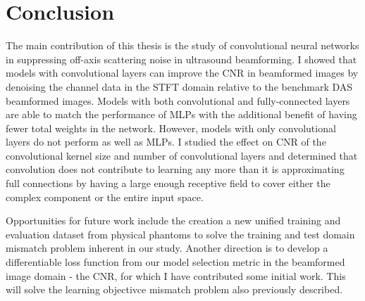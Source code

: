 \chapter{Conclusion}
The main contribution of this thesis is the study of convolutional neural networks in suppressing off-axis scattering noise in ultrasound beamforming. I showed that models with convolutional layers can improve the CNR in beamformed images by denoising the channel data in the STFT domain relative to the benchmark DAS beamformed images. Models with both convolutional and fully-connected layers are able to match the performance of MLPs with the additional benefit of having fewer total weights in the network. However, models with only convolutional layers do not perform as well as MLPs. I studied the effect on CNR of the convolutional kernel size and number of convolutional layers and determined that convolution does not contribute to learning any more than it is approximating full connections by having a large enough receptive field to cover either the complex component or the entire input space.

Opportunities for future work include the creation a new unified training and evaluation dataset from physical phantoms to solve the training and test domain mismatch problem inherent in our study. Another direction is to develop a differentiable loss function from our model selection metric in the beamformed image domain - the CNR, for which I have contributed some initial work. This will solve the learning objectivce mismatch problem also previously described.
